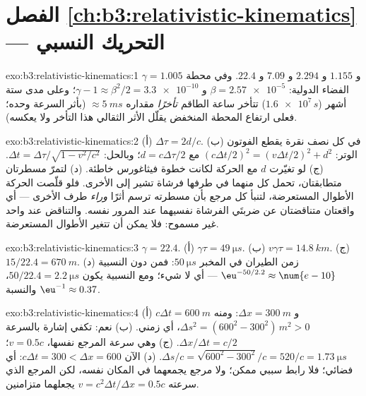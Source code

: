 \section*{الفصل \ref{ch:b3:relativistic-kinematics} --- التحريك النسبي}

\begin{solution}{exo:b3:relativistic-kinematics:1}
$\gamma = 1.005$ و $1.155$ و $2.294$ و $7.09$ و $22.4$. وفي محطة الفضاء الدولية: $\beta =
\num{2.57e-5}$ و $\gamma - 1 \approx \beta^2/2 = \num{3.3e-10}$؛ وعلى
مدى ستة أشهر ($\num{1.6e7}{}\,\unit{s}$) تتأخر ساعة الطاقم
\emph{تأخرًا} مقداره $\approx\qty{5}{ms}$ (بأثر السرعة وحده؛ فعلى
ارتفاع المحطة المنخفض يقلّل الأثر الثقالي هذا التأخر ولا
يعكسه).
\end{solution}

\begin{solution}{exo:b3:relativistic-kinematics:2}
(أ) $\Delta\tau = 2d/c$. (ب) في كل نصف نقرة يقطع الفوتون
الوتر: $(c\Delta t/2)^2 = (v\Delta t/2)^2 + d^2$ مع $d =
c\Delta\tau/2$؛ وبالحل: $\Delta t = \Delta\tau/\sqrt{1 - v^2/c^2}$. (ج)
لو تغيّرت $d$ مع الحركة لكانت خطوة فيثاغورس خاطئة. (د)
لتمرّ مسطرتان متطابقتان، تحمل كل منهما في طرفها فرشاة تشير
إلى الأخرى. فلو قلّصت الحركة الأطوال المستعرضة، لتنبأ كل
مرجع بأن مسطرته ترسم أثرًا \emph{وراء} طرف الأخرى --- أي
واقعتان متناقضتان عن ضربتَي الفرشاة نفسيهما عند  المرور
نفسه. والتناقض عند  واحد غير مسموح: فلا يمكن أن تتغير
الأطوال المستعرضة.
\end{solution}

\begin{solution}{exo:b3:relativistic-kinematics:3}
$\gamma = 22.4$. (أ) $\gamma\tau = \qty{49}{\micro s}$. (ب) $v\gamma
\tau = \qty{14.8}{km}$. (ج) $15/22.4 = \qty{670}{m}$. (د) زمن
الطيران في المخبر $\qty{50}{\micro s}$: فمن دون النسبية
$\eu^{-50/2.2} \approx \num{e-10}$ --- أي لا شيء؛ ومع النسبية يكون
 $50/22.4 = \qty{2.2}{\micro s}$، والنسبة $\eu^{-1}
\approx 0.37$.
\end{solution}

\begin{solution}{exo:b3:relativistic-kinematics:4}
(أ) $c\Delta t = \qty{600}{m}$ و $\Delta x = \qty{300}{m}$: ومنه $\Delta s^2
= (600^2 - 300^2)\,\unit{m^2} > 0$، أي زمني. (ب) نعم: تكفي إشارة
بالسرعة $\Delta x/\Delta t = c/2$. (ج) وهي سرعة المرجع نفسها، $v =
0.5c$؛  $\Delta s/c = \sqrt{600^2 - 300^2}/c = 520/c =
\qty{1.73}{\micro s}$. (د) الآن $c\Delta t = 300 < \Delta x = 600$:
أي فضائي؛ فلا رابط سببي ممكن؛ ولا مرجع يجمعهما في المكان
نفسه، لكن المرجع الذي سرعته $v = c^2\Delta t/\Delta x = 0.5c$ يجعلهما
متزامنين.
\end{solution}

